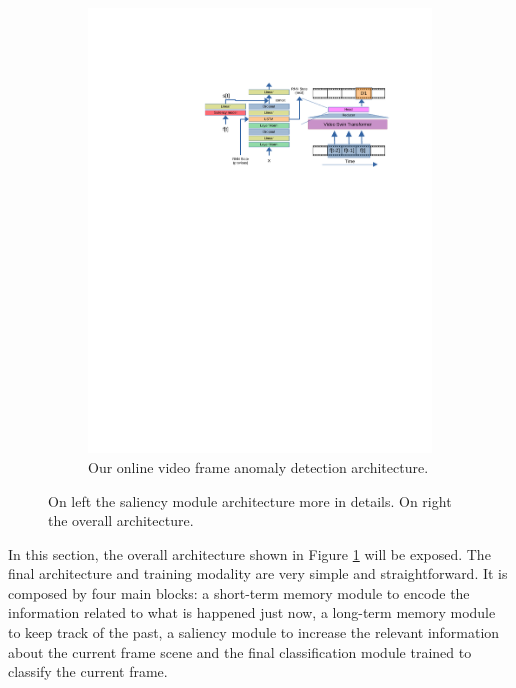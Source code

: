\begin{figure}[h!]
\begin{subfigure}{0.7\linewidth}
            \includegraphics[trim=205 500 80 130, clip, width=1.\linewidth]{images/arch.pdf}
        \caption{Our online video frame anomaly detection architecture.}
		\label{fig:arch}
	\end{subfigure}
	\caption{On left the saliency module architecture more in details. On right the overall architecture.}
	\label{fig:our-arch}
\end{figure}

In this section, the overall architecture shown in Figure \ref{fig:arch} will be exposed.
The final architecture and training modality are very simple and straightforward.
It is composed by four main blocks: a short-term memory module to encode the information related to what is happened just now, a long-term memory module to keep track of the past, a saliency module to increase the relevant information about the current frame scene and the final classification module trained to classify the current frame.

